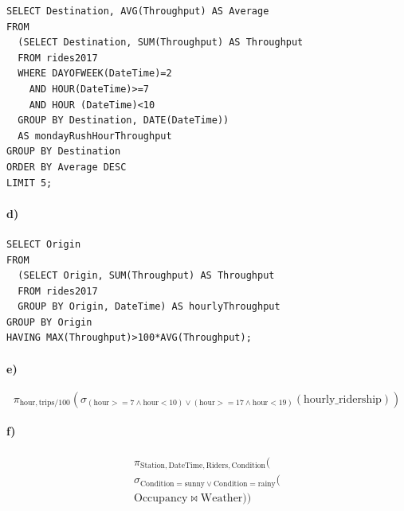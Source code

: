 \documentclass[12pt]{article}
\begin{document}
\begin{verbatim}
SELECT Destination, AVG(Throughput) AS Average
FROM
  (SELECT Destination, SUM(Throughput) AS Throughput
  FROM rides2017
  WHERE DAYOFWEEK(DateTime)=2
    AND HOUR(DateTime)>=7
    AND HOUR (DateTime)<10
  GROUP BY Destination, DATE(DateTime))
  AS mondayRushHourThroughput
GROUP BY Destination
ORDER BY Average DESC
LIMIT 5;
\end{verbatim}

\paragraph{d)}

\begin{verbatim}
SELECT Origin
FROM
  (SELECT Origin, SUM(Throughput) AS Throughput
  FROM rides2017
  GROUP BY Origin, DateTime) AS hourlyThroughput
GROUP BY Origin
HAVING MAX(Throughput)>100*AVG(Throughput);
\end{verbatim}

\paragraph{e)}

\[
        \pi_{\text{hour}, \text{trips}/100}(
                \sigma_{(\text{hour}>=7 \wedge \text{hour}<10)\vee (\text{hour}>=17 \wedge \text{hour}<19)}(
                        \text{hourly\_ridership}))
\]

\paragraph{f)}

\begin{multline*}
        \pi_{\text{Station},\text{DateTime},\text{Riders},\text{Condition}}(\\
                \sigma_{\text{Condition}=\text{sunny}\vee\text{Condition}=\text{rainy}}(\\
                        \text{Occupancy} \bowtie \text{Weather}))
\end{multline*}
\end{document}
